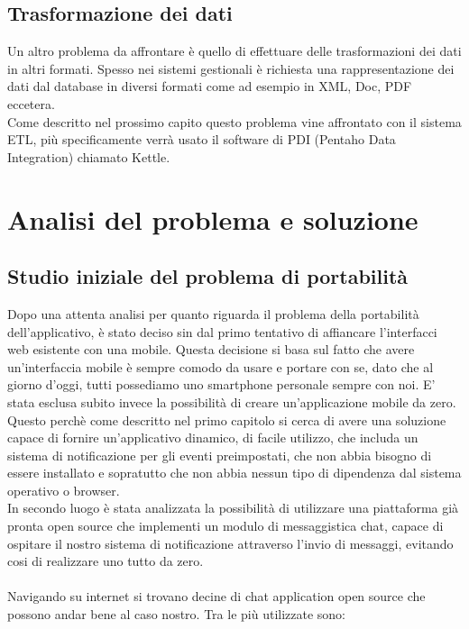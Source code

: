 \subsection{Trasformazione dei dati}
Un altro problema da affrontare è quello di effettuare delle trasformazioni dei dati in altri formati. Spesso nei sistemi gestionali è richiesta una rappresentazione dei dati dal database in diversi formati come ad esempio in XML, Doc, PDF eccetera.  \\
Come descritto nel prossimo capito questo problema vine affrontato con il sistema ETL, più specificamente verrà usato il software di PDI (Pentaho Data Integration) chiamato Kettle.


\section{Analisi del problema e soluzione}


\subsection{Studio iniziale del problema di portabilità}
Dopo una attenta analisi per quanto riguarda il problema della portabilità dell'applicativo, è stato deciso sin dal primo tentativo di affiancare l'interfacci web esistente con una mobile. Questa decisione si basa sul fatto che avere un'interfaccia mobile è sempre comodo da usare e portare con se, dato che al giorno d'oggi, tutti possediamo uno smartphone personale sempre con noi. E' stata esclusa subito invece la possibilità di creare un'applicazione mobile da zero. Questo perchè come descritto nel primo capitolo si cerca di avere una soluzione capace di fornire un'applicativo dinamico, di facile utilizzo, che includa un sistema di notificazione per gli eventi preimpostati, che non abbia bisogno di essere installato e sopratutto che non abbia nessun tipo di dipendenza dal sistema operativo o browser.\\ 
 In secondo luogo è stata analizzata la possibilità di utilizzare una piattaforma già pronta open source che implementi un modulo di messaggistica chat, capace di ospitare il nostro sistema di notificazione attraverso l'invio di messaggi, evitando cosi di realizzare uno tutto da zero.\\\\
Navigando su internet si trovano decine di chat application open source che possono andar bene al caso nostro. Tra le più utilizzate sono: \\\\

